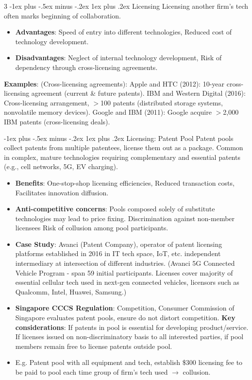 \documentclass[10pt, landscape]{article}
\makeatletter
\renewcommand{\subsubsection}{\@startsection{subsubsection}{3}{0mm}%
                                {-1ex plus -.5ex minus -.2ex}%
                                {1ex plus .2ex}%
                                {\normalfont\small\bfseries}}
\makeatother
\begin{document}
\begin{multicols*}{3}
\subsubsection{Licensing}
 Licensing another firm’s tech often marks beginning of collaboration. 
\begin{itemize}[itemsep=-1pt]
\item \textbf{Advantages}: Speed of entry into different technologies, Reduced cost of technology development.
\item \textbf{Disadvantages}: Neglect of internal technology development, Risk of dependency through cross-licensing agreements.
\end{itemize}
\textbf{Examples}: (Cross-licensing agreements): Apple and HTC (2012): 10-year cross-licensing agreement (current \& future patents).
IBM and Western Digital (2016): Cross-licensing arrangement, $>$100 patents (distributed storage systems, nonvolatile memory devices).
Google and IBM (2011): Google acquire $>$2,000 IBM patents (cross-licensing deals).

\subsubsection{Licensing: Patent Pool}
Patent pools collect patents from multiple patentees, license them out as a package. Common in complex, mature technologies requiring complementary and essential patents (e.g., cell networks, 5G, EV charging).
\begin{itemize}[itemsep=-1pt]
\item \textbf{Benefits}: One-stop-shop licensing efficiencies, Reduced transaction costs, Facilitates innovation diffusion.
\item \textbf{Anti-competitive concerns}: Pools composed solely of substitute technologies may lead to price fixing. Discrimination against non-member licensees
Risk of collusion among pool participants.
\item \textbf{Case Study}: Avanci (Patent Company), operator of patent licensing platforms established in 2016 in IT tech space, IoT, etc. independent intermediary at intersection of different industries. (Avanci 5G Connected Vehicle Program - span 59 initial participants. Licenses cover majority of essential cellular tech used in next-gen connected vehicles, licensors such as Qualcomm, Intel, Huawei, Samsung.)
\item \textbf{Singapore CCCS Regulation}: Competition, Consumer Commission of Singapore evaluates patent pools, ensure do not distort competition. \textbf{Key considerations}: If patents in pool is essential for developing product/service. If licenses issued on non-discriminatory basis to all interested parties, if pool members remain free to license patents outside pool.
\item E.g. Patent pool with all equipment and tech, establish \$300 licensing fee to be paid to pool each time group of firm's tech used $\rightarrow$ collusion.
\end{itemize}



\end{multicols*}
\end{document}

